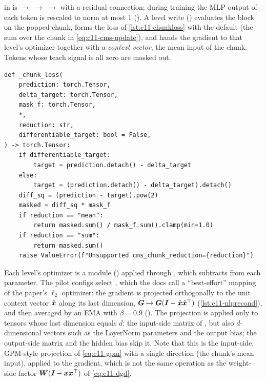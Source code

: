 \begin{implnote}[title={In the code: the CMS block and its local objective}]
 in  is  $\to$  $\to$
 $\to$  with a residual connection; during training the MLP output
of each token is rescaled to norm at most $1$ (). A level write
() evaluates the block on the popped chunk, forms the loss of
\cref{lst:c11-chunkloss} with the default  (the sum over the chunk
in \cref{eq:c11-cms-update}), and hands the gradient to that level's optimizer together with a
\emph{context vector}, the mean input of the chunk. Tokens whose teach signal is all zero are
masked out.
\end{implnote}

\begin{lstlisting}[caption={Excerpt from \texttt{repos/\allowbreak kmccleary3301\_\_nested\_learning/\allowbreak src/\allowbreak nested\_learning/\allowbreak hope/\allowbreak block.py}: the gradient-shaping loss whose gradient with respect to the prediction is $2\bm{\delta}$},label={lst:c11-chunkloss}]
def _chunk_loss(
    prediction: torch.Tensor,
    delta_target: torch.Tensor,
    mask_f: torch.Tensor,
    *,
    reduction: str,
    differentiable_target: bool = False,
) -> torch.Tensor:
    if differentiable_target:
        target = prediction.detach() - delta_target
    else:
        target = (prediction.detach() - delta_target).detach()
    diff_sq = (prediction - target).pow(2)
    masked = diff_sq * mask_f
    if reduction == "mean":
        return masked.sum() / mask_f.sum().clamp(min=1.0)
    if reduction == "sum":
        return masked.sum()
    raise ValueError(f"Unsupported cms_chunk_reduction={reduction}")
\end{lstlisting}

\begin{implnote}[title={In the code: the level optimizer projects out the context direction}]
Each level's optimizer is a  module () applied through
, which subtracts  from each parameter. The pilot
configs select , which the docs call a ``best-effort'' mapping of the
paper's $\ell_2$ optimizer: the gradient is projected orthogonally to the unit context vector
$\hat{\bm{x}}$ along its last dimension, $\bm{G} \mapsto \bm{G}(\bm{I} - \hat{\bm{x}}\hat{\bm{x}}^{\top})$
(\cref{lst:c11-nlprecond}), and then averaged by an EMA with $\beta = 0.9$
(). The projection is applied only to
tensors whose last dimension equals $d$: the input-side matrix of , but also
$d$-dimensional vectors such as the LayerNorm parameters and the output bias; the output-side
matrix and the hidden bias skip it. Note that this is the input-side, GPM-style projection of
\cref{eq:c11-gpm} with a single direction (the chunk's mean input), applied to the gradient, which
is not the same operation as the weight-side factor $\bm{W}(\bm{I} - \bm{x}\bm{x}^{\top})$ of \cref{eq:c11-dgd}.
\end{implnote}

